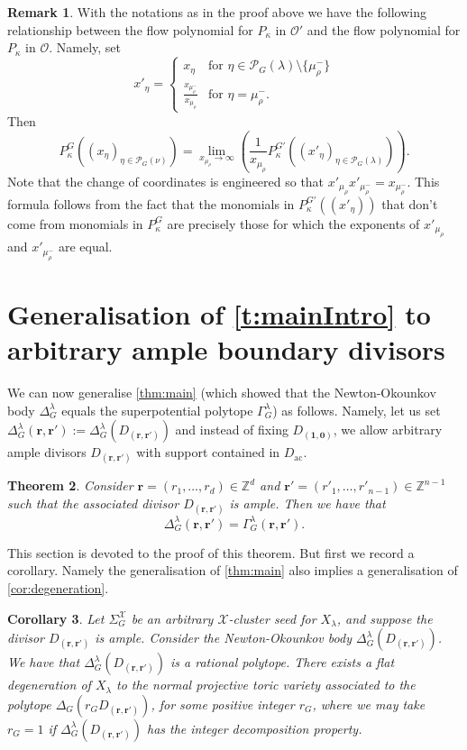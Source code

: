 \documentclass{amsart}
\newtheorem{thm}{Theorem}[section]
\newtheorem{cor}[thm]{Corollary}
\theoremstyle{definition}
\newtheorem{remark}[thm]{Remark}
\numberwithin{equation}{section}
\newcommand{\RG}{r_G}
\def\O{\mathcal{O}}
\newcommand{\Z}{\mathbb{Z}}
\newcommand{\ac}{\operatorname{ac}}
\begin{document}
\begin{remark}
With the notations as in the proof above we have the following relationship 
	between the flow polynomial for $P_{\kappa}$ in $\O'$ and 
	 the flow polynomial for $P_{\kappa}$ in $\O.$ 
	 Namely, set 
\[
x'_\eta=\begin{cases}
x_\eta & \text{for $\eta\in\mathcal P_G(\lambda)\setminus\{\mu_\rho^-\}$}\\
\frac{x_{\mu_\rho^-}}{x_{\mu_\rho}}&\text{for $\eta=\mu_\rho^-$.}
\end{cases}
\]
Then
\[
P^G_\kappa((x_\eta)_{\eta\in\mathcal P_G(\nu)})=
\lim_{x_{\mu_\rho}\to\infty}\left(\frac{1}{x_{\mu_\rho}}P^{G'}_\kappa((x'_\eta)_{\eta\in\mathcal P_G(\lambda)})\right).
\] 
Note that the change of coordinates is engineered so that $x'_{\mu_\rho}x'_{\mu_\rho^-}=x_{\mu_\rho^-}$. This formula follows from the fact that the monomials in $P^{G'}_\kappa((x'_\eta))$ that don't come from monomials in $P^G_\kappa$ are precisely those for which the exponents of $x'_{\mu_\rho}$ and $x'_{\mu_{\rho}^-}$ are equal. 
\end{remark}


\section{Generalisation of \cref{t:mainIntro} to arbitrary ample boundary divisors}\label{s:GenD}

We can now generalise \cref{thm:main} (which showed that the 
Newton-Okounkov body $\Delta_G^{\lambda}$ equals the superpotential polytope
$\Gamma_G^{\lambda}$) as follows. Namely, let us set $\Delta^{\lambda}_G(\mathbf r,\mathbf r'):=\Delta^{\lambda}_G(D_{(\mathbf r,\mathbf r')})$ and instead of fixing $D_{(\mathbf 1,\mathbf 0)}$, we allow arbitrary ample divisors $D_{(\mathbf r,\mathbf r')}$ with support contained in $D_{\ac}$. 
\begin{thm}\label{t:maingen}
 Consider $\mathbf{r}=(r_1,\dots,r_d)\in\Z^d$ and $\mathbf{r'}=(r'_1,\dots,r'_{n-1})\in \Z^{n-1}$ such that the associated divisor $D_{(\mathbf r,\mathbf r')}$ is ample. Then we have that 
$$\Delta^{\lambda}_G(\mathbf r,\mathbf r')= \Gamma^{\lambda}_G(\mathbf r,\mathbf r').$$
\end{thm}

This section is devoted to the proof of this theorem. But first we record a corollary. Namely the generalisation of \cref{thm:main} also implies a generalisation of \cref{cor:degeneration}.


\begin{cor}
	\label{cor:degenerationgen}
Let $\Sigma_G^{\mathcal X}$ be an arbitrary $\mathcal X$-cluster seed
	for $X_{\lambda}$, and suppose the divisor $D_{(\mathbf r,\mathbf r')}$ is ample.  Consider the Newton-Okounkov body
$\Delta_G^{\lambda}(D_{(\mathbf r,\mathbf r')})$.
We have that $\Delta_G^{\lambda}(D_{(\mathbf r,\mathbf r')})$ is a rational polytope. 
There exists a flat degeneration of $X_{\lambda}$
to the normal projective toric variety
associated to the  polytope $\Delta_G(\RG D_{(\mathbf r,\mathbf r')})$, for some  positive integer $\RG$, where we may take $\RG=1$ if $\Delta_G^{\lambda}(D_{(\mathbf r,\mathbf r')})$ has the integer decomposition property.
\end{cor}
\end{document}
